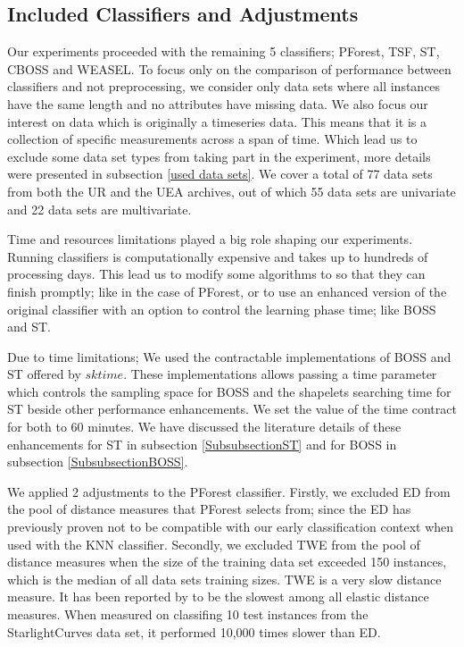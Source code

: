 \subsection{Included Classifiers and Adjustments}
\label{SubsectionIncludedClassifiers}
Our experiments proceeded with the remaining 5 classifiers; PForest, TSF, ST, CBOSS and WEASEL.
To focus only on the comparison of performance between classifiers and not preprocessing, we consider only data sets where all instances have the same length and no attributes have missing data.
We also focus our interest on data which is originally a timeseries data. This means that it is a collection of specific measurements across a span of time.
Which lead us to exclude some data set types from taking part in the experiment, more details were presented in subsection \ref{used data sets}.
We cover a total of 77 data sets from both the UR and the UEA archives, out of which 55 data sets are univariate and 22 data sets are multivariate.

Time and resources limitations played a big role shaping our experiments. Running classifiers is computationally expensive \cite{schafer2020teaser}
and takes up to hundreds of processing days.
This lead us to modify some algorithms to so that they can finish promptly; like in the case of PForest, or to use an enhanced version of the original
classifier with an option to control the learning phase time; like BOSS and ST.

Due to time limitations; We used the contractable implementations of BOSS and ST offered by $sktime$.
These implementations allows passing a time parameter which controls the sampling space for BOSS and the shapelets searching time for ST
beside other performance enhancements.
We set the value of the time contract for both to 60 minutes.
We have discussed the literature details of these enhancements for ST in subsection \ref{SubsubsectionST} and for BOSS in subsection \ref{SubsubsectionBOSS}.

We applied 2 adjustments to the PForest classifier.
Firstly, we excluded ED from the pool of distance measures that PForest selects from; since the ED has previously proven not to be compatible with our early classification context when used with the KNN classifier.
Secondly, we excluded TWE from the pool of distance measures when the size of the training data set exceeded 150 instances, which is the median of all data sets training sizes.
TWE is a very slow distance measure. It has been reported by \cite{bagnall2017great} to be the slowest among all elastic distance measures. When measured on classifing 10 test instances from the
StarlightCurves data set, it performed 10,000 times slower than ED.

